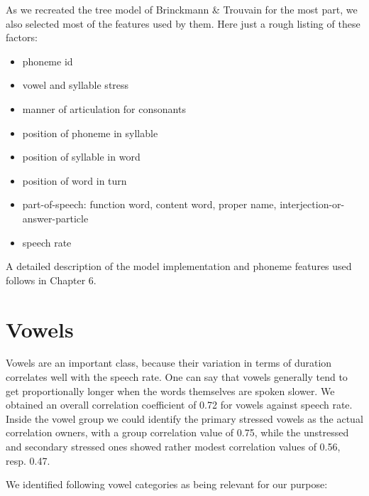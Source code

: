 \documentclass[a4paper]{scrreprt}
\begin{document}
As we recreated the tree model of Brinckmann \& Trouvain \cite{Brinckmann_2003} for the most part, we also selected most of the features used by them. Here just a rough listing of these factors:

\begin{itemize}
	\item phoneme id
	\item vowel and syllable stress
	\item manner of articulation for consonants
	\item position of phoneme in syllable
	\item position of syllable in word
	\item position of word in turn
	\item part-of-speech: function word, content word, proper name, interjection-or-answer-particle
	\item speech rate
\end{itemize}

A detailed description of the model implementation and phoneme features used follows in Chapter 6.

\section{Vowels}
Vowels are an important class, because their variation in terms of duration correlates well with the speech rate. One can say that vowels generally tend to get proportionally longer when the words themselves are spoken slower. We obtained an overall correlation coefficient of 0.72 for vowels against speech rate. Inside the vowel group we could identify the primary stressed vowels as the actual correlation owners, with a group correlation value of 0.75, while the unstressed and secondary stressed ones showed rather modest correlation values of 0.56, resp. 0.47. 

We identified following vowel categories as being relevant for our purpose:
\end{document}
